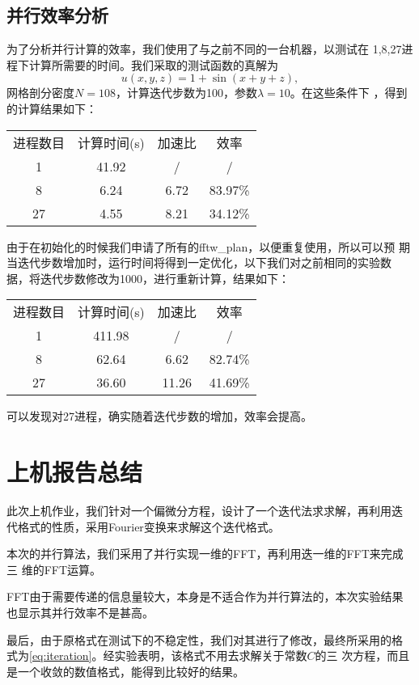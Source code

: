 \documentclass[a4paper,  11pt]{ctexart}
\begin{document}
\subsection{并行效率分析}
为了分析并行计算的效率，我们使用了与之前不同的一台机器，以测试在
1,8,27进程下计算所需要的时间。我们采取的测试函数的真解为
\begin{equation}
	u(x,y,z)=1+\sin(x+y+z),
\end{equation}
网格剖分密度$N=108$，计算迭代步数为100，参数$\lambda=10$。在这些条件下
，得到的计算结果如下：
\begin{table}[H]
	\centering
	\begin{tabular}{cccc}
		\hline
		进程数目 & 计算时间(s) & 加速比 & 效率  \\
		1 & 41.92& / & /\\
		8 & 6.24& 6.72& 83.97\% \\
		27 & 4.55 & 8.21 & 34.12\% \\
		\hline
	\end{tabular}
\end{table}
由于在初始化的时候我们申请了所有的fftw\_plan，以便重复使用，所以可以预
期当迭代步数增加时，运行时间将得到一定优化，以下我们对之前相同的实验数
据，将迭代步数修改为1000，进行重新计算，结果如下：
\begin{table}[H]
	\centering
	\begin{tabular}{cccc}
		\hline
		进程数目 & 计算时间(s) & 加速比 & 效率  \\
		1 & 411.98& / & /\\
		8 & 62.64& 6.62& 82.74\% \\
		27 & 36.60 & 11.26 & 41.69\% \\
		\hline
	\end{tabular}
\end{table}
可以发现对27进程，确实随着迭代步数的增加，效率会提高。
\section{上机报告总结}
此次上机作业，我们针对一个偏微分方程，设计了一个迭代法求求解，再利用迭
代格式的性质，采用Fourier变换来求解这个迭代格式。
\par
本次的并行算法，我们采用了并行实现一维的FFT，再利用迭一维的FFT来完成三
维的FFT运算。
\par
FFT由于需要传递的信息量较大，本身是不适合作为并行算法的，本次实验结果
也显示其并行效率不是甚高。
\par
最后，由于原格式在测试下的不稳定性，我们对其进行了修改，最终所采用的格
式为\eqref{eq:iteration}。经实验表明，该格式不用去求解关于常数$C$的三
次方程，而且是一个收敛的数值格式，能得到比较好的结果。
\end{document}
